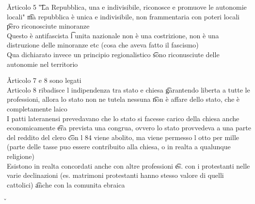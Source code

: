 \documentclass[12pt]{article}
\begin{document}
\v

Articolo 5 \t "La Repubblica, una e indivisibile, riconosce e promuove le autonomie locali" \t ma repubblica è unica e indivisibile, non frammentaria con poteri locali \t pero riconosciute minoranze \\
Questo è antifascista \t l unita nazionale non è una costrizione, non è una distruzione delle minoranze etc (cosa che aveva fatto il fascismo) \\
Qua dichiarato invece un principio regionalistico \t sono riconusciute delle autonomie nel territorio

\v

Articolo 7 e 8 sono legati \\
Articolo 8 ribadisce l indipendenza tra stato e chiesa \t garantendo liberta a tutte le professioni, allora lo stato non ne tutela nessuna \t non è affare dello stato, che è completamente laico \\
I patti lateranensi prevedavano che lo stato si facesse carico della chiesa anche economicamente \t era prevista una congrua, ovvero lo stato provvedeva a una parte del reddito del clero \t con l 84 viene abolito, ma viene permesso l otto per mille (parte delle tasse puo essere contribuito alla chiesa, o in realta a qualunque religione) \\
Esistono in realta concordati anche con altre professioni \t es. con i protestanti nelle varie declinazioni (es. matrimoni protestanti hanno stesso valore di quelli cattolici) \t anche con la comunita ebraica

\v
\end{document}
